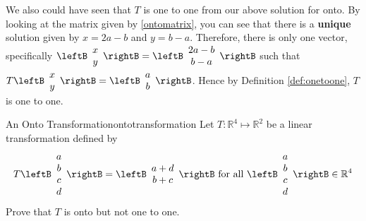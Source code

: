 \begin{solution}
We also could have seen that $T$ is one to one from our above solution for onto. By looking at the matrix given 
by \ref{ontomatrix}, you can see that there is a \textbf{unique} solution given
by $x=2a-b$ and $y=b-a$. Therefore, there
is only one vector, specifically 
$\leftB
\begin{array}{c}
x \\
y
\end{array}
\rightB
=
\leftB
\begin{array}{c}
2a-b\\
b-a
\end{array}
\rightB $ such that $T\leftB
\begin{array}{c}
x \\
y
\end{array}
\rightB =\leftB
\begin{array}{c}
a \\
b
\end{array}
\rightB $. Hence by Definition \ref{def:onetoone}, $T$ is one to one.
\end{solution}

\begin{example}{An Onto Transformation}{ontotransformation}
Let $T: \mathbb{R}^4 \mapsto \mathbb{R}^2$ be a linear transformation defined by
\[
T \leftB \begin{array}{c}
a \\
b \\
c \\
d
\end{array}
\rightB = 
\leftB \begin{array}{c}
a + d \\
b + c 
\end{array}
\rightB
\mbox{ for all } \leftB \begin{array}{c}
a \\
b \\
c \\
d
\end{array}
\rightB \in \mathbb{R}^4
\]
Prove that $T$ is onto but not one to one.
\end{example}

